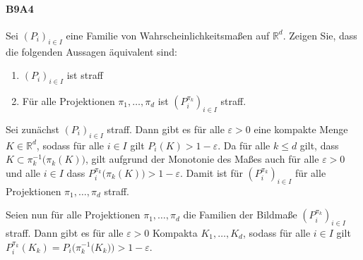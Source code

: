\documentclass{article}
\begin{document}

\paragraph{B9A4}
Sei $(P_i)_{i\in I}$ eine Familie von Wahrscheinlichkeitsmaßen auf $\mathbb{R}^d$.
Zeigen Sie, dass die folgenden Aussagen äquivalent sind:
\begin{enumerate}
\item $(P_i)_{i\in I}$ ist straff
\item Für alle Projektionen $\pi_1,\dots,\pi_d$ ist $(P_i^{\pi_k})_{i\in I}$ straff.
\end{enumerate}
Sei zunächst $(P_i)_{i\in I}$ straff.
Dann gibt es für alle $\varepsilon>0$ eine kompakte Menge $K\in\mathbb{R}^d$, sodass für alle $i\in I$ gilt $P_i(K)>1-\varepsilon$.
Da für alle $k\leq d$ gilt, dass $K\subset \pi_k^{-1}\bigl(\pi_k(K)\bigr)$, gilt aufgrund der Monotonie des Maßes auch für alle $\varepsilon>0$ und alle $i\in I$ dass $P_i^{\pi_k}\bigl(\pi_k(K)\bigr)>1-\varepsilon$.
Damit ist für $(P_i^{\pi_k})_{i\in I}$ für alle Projektionen $\pi_1,\dots,\pi_d$ straff.

Seien nun für alle Projektionen $\pi_1,\dots,\pi_d$ die Familien der Bildmaße $(P_i^{\pi_k})_{i\in I}$ straff.
Dann gibt es für alle $\varepsilon>0$ Kompakta $K_1,\dots,K_d$, sodass für alle $i\in I$ gilt $P_i^{\pi_k}(K_k)=P_i\bigl(\pi_k^{-1}\bigr(K_k)\bigr)>1-\varepsilon$.
\newpage



\end{document}
